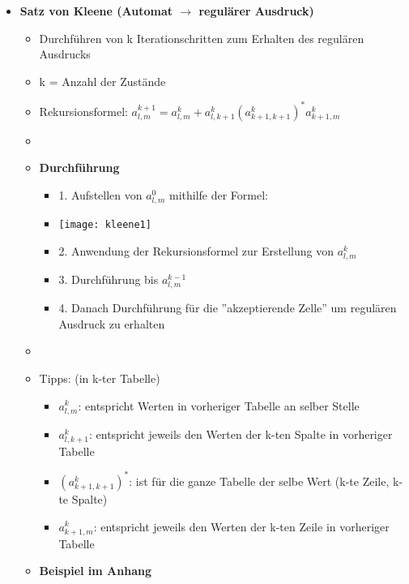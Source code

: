 \begin{itemize}
\item {\large \textbf{Satz von Kleene (Automat $\rightarrow$ regulärer Ausdruck)}}
	\begin{itemize}
	\item Durchführen von k Iterationschritten zum Erhalten des regulären Ausdrucks
	\item k = Anzahl der Zustände
	\item Rekursionsformel: $a^{k+1}_{l,m} = a^k_{l,m} + a^k_{l,k+1}(a^k_{k+1,k+1})^*a^k_{k+1,m}$
	\item[]
	\item \textbf{Durchführung}
		\begin{itemize}		
		\item 1. Aufstellen von $a^0_{l,m}$ mithilfe der Formel:
		\item[]
			\begin{center}
			\texttt{[image: kleene1]}
			\end{center}
		\item 2. Anwendung der Rekursionsformel zur Erstellung von $a^k_{l,m}$
		\item 3. Durchführung bis $a^{k-1}_{l,m}$
		\item 4. Danach Durchführung für die ''akzeptierende Zelle'' um regulären Ausdruck zu erhalten
	\end{itemize}
	\item[]
	\item Tipps: (in k-ter Tabelle)
		\begin{itemize}
		\item $a^k_{l,m}$:			entspricht Werten in vorheriger Tabelle an selber Stelle
		\item $a^k_{l,k+1}$:		entspricht jeweils den Werten der k-ten Spalte in vorheriger Tabelle
		\item $(a^k_{k+1,k+1})^*$: ist für die ganze Tabelle der selbe Wert (k-te Zeile, k-te Spalte)
		\item $a^k_{k+1,m}$:		entspricht jeweils den Werten der k-ten Zeile in vorheriger Tabelle
		\end{itemize}
	\item \textbf{Beispiel im Anhang}
	
	\end{itemize}
		

\end{itemize}
